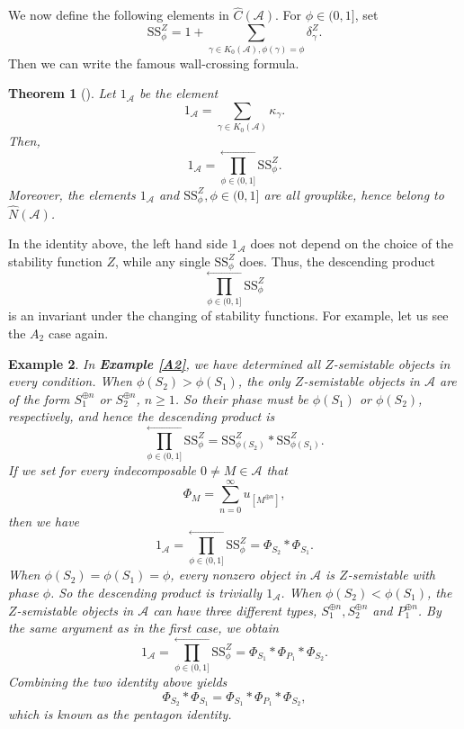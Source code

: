 \documentclass[a4paper,12pt]{amsart}
\newtheorem{theorem}{Theorem}[section]
\newtheorem{example}[theorem]{Example}
\newcommand{\Ss}{\mathrm{SS}}
\begin{document}
We now define the following elements in $\hat{C}(\mathcal{A})$. For $\phi\in (0,1]$, set
\[\Ss^Z_\phi=1+\sum_{\gamma\in K_0(\mathcal{A}), \phi(\gamma)=\phi}\delta^Z_\gamma.\]
Then we can write the famous wall-crossing formula.
\begin{theorem}[\cite{Rei2002}]
    Let $1_\mathcal{A}$ be the element
    \[1_\mathcal{A}=\sum_{\gamma\in K_0(\mathcal{A})}\kappa_\gamma.\]
    Then,
    \[1_\mathcal{A}=\prod^{\leftarrow}_{\phi\in(0,1]}\Ss^Z_\phi.\]
    Moreover, the elements $1_\mathcal{A}$ and $\Ss^Z_\phi,\phi\in(0,1]$ are all grouplike, hence belong to $\hat{N}(\mathcal{A})$.
\end{theorem}
In the identity above, the left hand side $1_\mathcal{A}$ does not depend on the choice of the stability function $Z$, while any single $\Ss^Z_\phi$ does. Thus, the descending product 
\[\prod^{\leftarrow}_{\phi\in(0,1]}\Ss^Z_\phi\]
is an invariant under the changing of stability functions. For example, let us see the $A_2$ case again.
\begin{example}\label{A2,abelian}
    In \textbf{Example \ref{A2}}, we have determined all $Z$-semistable objects in every condition. When $\phi(S_2)>\phi(S_1)$, the only $Z$-semistable objects in $\mathcal{A}$ are of the form $S_1^{\oplus n}$ or $S_2^{\oplus n}$, $n\geqslant1$. So their phase must be $\phi(S_1)$ or $\phi(S_2)$, respectively, and hence the descending product is
    \[\prod^\leftarrow_{\phi\in(0,1]}\Ss^Z_\phi=\Ss^Z_{\phi(S_2)}*\Ss^Z_{\phi(S_1)}.\]
    If we set for every indecomposable $0\neq M\in\mathcal{A}$ that
    \[\Phi_M=\sum_{n=0}^\infty u_{[M^{\oplus n}]},\]
    then we have
    \[1_\mathcal{A}=\prod^\leftarrow_{\phi\in(0,1]}\Ss^Z_\phi=\Phi_{S_2}*\Phi_{S_1}.\]
    When $\phi(S_2)=\phi(S_1)=\phi$, every nonzero object in $\mathcal{A}$ is $Z$-semistable with phase $\phi$. So the descending product is trivially $1_\mathcal{A}$. When $\phi(S_2)<\phi(S_1)$, the $Z$-semistable objects in $\mathcal{A}$ can have three different types, $S_1^{\oplus n},S_2^{\oplus n}$ and $P_1^{\oplus n}$. By the same argument as in the first case, we obtain
    \[1_\mathcal{A}=\prod^\leftarrow_{\phi\in(0,1]}\Ss^Z_\phi=\Phi_{S_1}*\Phi_{P_1}*\Phi_{S_2}.\]
    Combining the two identity above yields
    \[\Phi_{S_2}*\Phi_{S_1}=\Phi_{S_1}*\Phi_{P_1}*\Phi_{S_2},\]
    which is known as the pentagon identity.
\end{example}
\end{document}

